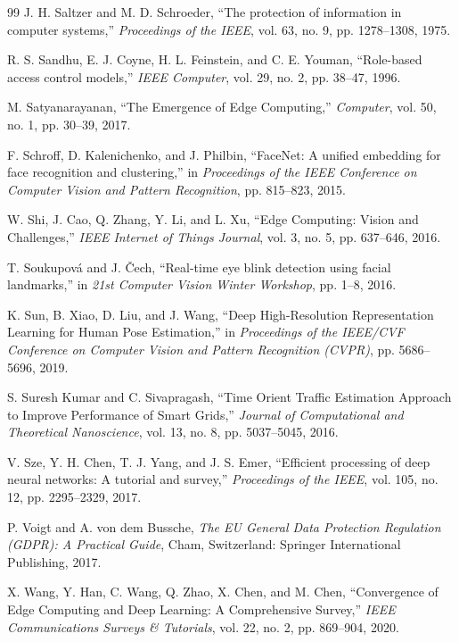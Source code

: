 \documentclass[12pt,a4paper,oneside]{report}
\begin{document}
\begin{thebibliography}{99}
J. H. Saltzer and M. D. Schroeder, ``The protection of information in computer systems,'' \textit{Proceedings of the IEEE}, vol. 63, no. 9, pp. 1278--1308, 1975.

R. S. Sandhu, E. J. Coyne, H. L. Feinstein, and C. E. Youman, ``Role-based access control models,'' \textit{IEEE Computer}, vol. 29, no. 2, pp. 38--47, 1996.

M. Satyanarayanan, ``The Emergence of Edge Computing,'' \textit{Computer}, vol. 50, no. 1, pp. 30--39, 2017.

F. Schroff, D. Kalenichenko, and J. Philbin, ``FaceNet: A unified embedding for face recognition and clustering,'' in \textit{Proceedings of the IEEE Conference on Computer Vision and Pattern Recognition}, pp. 815--823, 2015.

W. Shi, J. Cao, Q. Zhang, Y. Li, and L. Xu, ``Edge Computing: Vision and Challenges,'' \textit{IEEE Internet of Things Journal}, vol. 3, no. 5, pp. 637--646, 2016.

T. Soukupov\'{a} and J. \v{C}ech, ``Real-time eye blink detection using facial landmarks,'' in \textit{21st Computer Vision Winter Workshop}, pp. 1--8, 2016.

K. Sun, B. Xiao, D. Liu, and J. Wang, ``Deep High-Resolution Representation Learning for Human Pose Estimation,'' in \textit{Proceedings of the IEEE/CVF Conference on Computer Vision and Pattern Recognition (CVPR)}, pp. 5686--5696, 2019.

S. Suresh Kumar and C. Sivapragash, ``Time Orient Traffic Estimation Approach to Improve Performance of Smart Grids,'' \textit{Journal of Computational and Theoretical Nanoscience}, vol. 13, no. 8, pp. 5037--5045, 2016.

V. Sze, Y. H. Chen, T. J. Yang, and J. S. Emer, ``Efficient processing of deep neural networks: A tutorial and survey,'' \textit{Proceedings of the IEEE}, vol. 105, no. 12, pp. 2295--2329, 2017.

P. Voigt and A. von dem Bussche, \textit{The EU General Data Protection Regulation (GDPR): A Practical Guide}, Cham, Switzerland: Springer International Publishing, 2017.

X. Wang, Y. Han, C. Wang, Q. Zhao, X. Chen, and M. Chen, ``Convergence of Edge Computing and Deep Learning: A Comprehensive Survey,'' \textit{IEEE Communications Surveys \& Tutorials}, vol. 22, no. 2, pp. 869--904, 2020.


\end{thebibliography}
\end{document}
